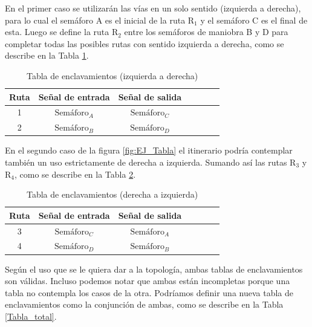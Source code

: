 		En el primer caso se utilizarán las vías en un solo sentido (izquierda a derecha), para lo cual el semáforo A es el inicial de la ruta $\text{R}_1$ y el semáforo C es el final de esta. Luego se define la ruta $\text{R}_2$ entre los semáforos de maniobra B y D para completar todas las posibles rutas con sentido izquierda a derecha, como se describe en la Tabla \ref{Tabla_simple}.
		
		\begin{table}[!hbt]
		\renewcommand{\arraystretch}{1.3}
	
		\caption{Tabla de enclavamientos (izquierda a derecha)}
		\label{Tabla_simple}
		\centering
	
		\begin{tabular}{c c c c c c c}
		\hline
		Ruta & Señal de entrada & Señal de salida \\
		\hline
		 1 & $\text{Semáforo}_A$  & $\text{Semáforo}_C$ \\
		 2 & $\text{Semáforo}_B$  & $\text{Semáforo}_D$ \\
		\hline
		\end{tabular}
		\end{table}
		
		En el segundo caso de la figura \ref{fig:EJ_Tabla} el itinerario podría contemplar también un uso estrictamente de derecha a izquierda. Sumando así las rutas $\text{R}_3$ y $\text{R}_4$, como se describe en la Tabla \ref{Tabla_bidireccional}.
		
		\begin{table}[!hbt]
		\renewcommand{\arraystretch}{1.3}
	
		\caption{Tabla de enclavamientos (derecha a izquierda)}
		\label{Tabla_bidireccional}
		\centering
	
		\begin{tabular}{c c c c c c c}
		\hline
		Ruta & Señal de entrada & Señal de salida \\
		\hline
		 3 & $\text{Semáforo}_C$  & $\text{Semáforo}_A$ \\
		 4 & $\text{Semáforo}_D$  & $\text{Semáforo}_B$ \\
		\hline
		\end{tabular}
		\end{table}
		
		Según el uso que se le quiera dar a la topología, ambas tablas de enclavamientos son válidas. Incluso podemos notar que ambas están incompletas porque una tabla no contempla los casos de la otra. Podríamos definir una nueva tabla de enclavamientos como la conjunción de ambas, como se describe en la Tabla \ref{Tabla_total}.
		
